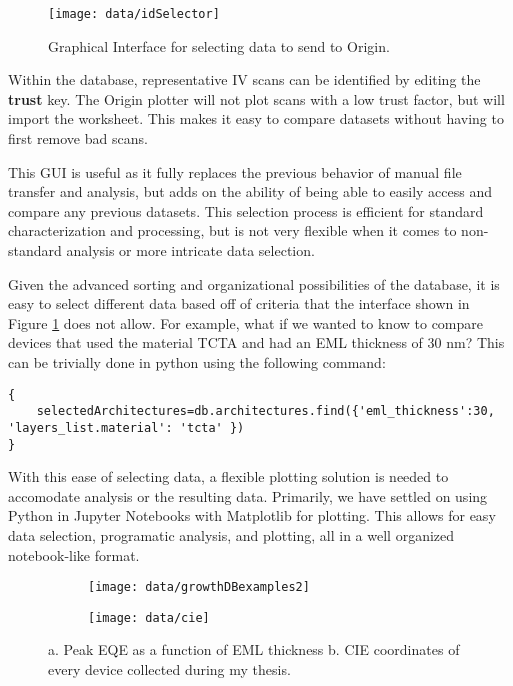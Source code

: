 \documentclass[../thesis.tex]{subfiles}
\begin{document}
\begin{figure}[ht]
\centering
\texttt{[image: data/idSelector]}
\caption{Graphical Interface for selecting data to send to Origin.}
\label{fig:idSelector}
\end{figure}

Within the database, representative IV scans can be identified by editing the \textbf{trust} key.
The Origin plotter will not plot scans with a low trust factor, but will import the worksheet.
This makes it easy to compare datasets without having to first remove bad scans.

This GUI is useful as it fully replaces the previous behavior of manual file transfer and analysis, but adds on the ability of being able to easily access and compare any previous datasets.
This selection process is efficient for standard characterization and processing, but is not very flexible when it comes to non-standard analysis or more intricate data selection.

Given the advanced sorting and organizational possibilities of the database, it is easy to select different data based off of criteria that the interface shown in Figure \ref{fig:idSelector} does not allow.
For example, what if we wanted to know to compare devices that used the material TCTA and had an EML thickness of 30 nm?
This can be trivially done in python using the following command:
\begin{lstlisting}
{
    selectedArchitectures=db.architectures.find({'eml_thickness':30, 'layers_list.material': 'tcta' })
}
\end{lstlisting}

With this ease of selecting data, a flexible plotting solution is needed to accomodate analysis or the resulting data.  
Primarily, we have settled on using Python in Jupyter Notebooks with Matplotlib for plotting.
This allows for easy data selection, programatic analysis, and plotting, all in a well organized notebook-like format.

\begin{figure}[ht]
\centering
    \begin{subfigure}{.4\textwidth}
    \texttt{[image: data/growthDBexamples2]}
    \caption{}
    \label{fig:growthDBexamples1}\par\vfill
    \end{subfigure}
    \begin{subfigure}{.4\textwidth}
    \texttt{[image: data/cie]}
    \caption{}
    \label{fig:data_cie}\par\vfill
    \end{subfigure}
\caption{  a. Peak EQE as a function of EML thickness b. CIE coordinates of every device collected during my thesis. }
\end{figure}
\end{document}
